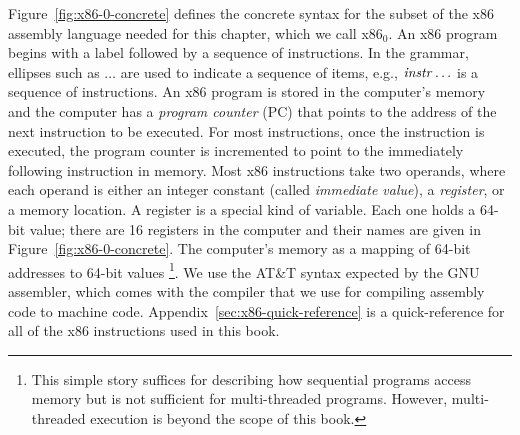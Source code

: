 \documentclass[11pt]{book}
\begin{document}
Figure~\ref{fig:x86-0-concrete} defines the concrete syntax for the subset of
the x86 assembly language needed for this chapter, which we call x86$_0$.
%
An x86 program begins with a  label followed by a sequence
of instructions.  In the grammar, ellipses such as $\ldots$ are used to
indicate a sequence of items, e.g., $\mathit{instr} \ldots$ is a sequence of
instructions.
%
An x86 program is stored in the computer's memory and the computer has
a \emph{program counter} (PC)
that points to the address of the next
instruction to be executed. For most instructions, once the
instruction is executed, the program counter is incremented to point
to the immediately following instruction in memory. Most x86
instructions take two operands, where each operand is either an
integer constant (called \emph{immediate value}),
a \emph{register}, or a memory location.
A register is a special kind of variable. Each
one holds a 64-bit value; there are 16 registers in the computer and
their names are given in Figure~\ref{fig:x86-0-concrete}. The computer's memory
as a mapping of 64-bit addresses to 64-bit values%
\footnote{This simple story suffices for describing how sequential
  programs access memory but is not sufficient for multi-threaded
  programs. However, multi-threaded execution is beyond the scope of
  this book.}.
%
We use the AT\&T syntax expected by the GNU assembler, which comes
with the  compiler that we use for compiling assembly code to
machine code.
%
Appendix~\ref{sec:x86-quick-reference} is a quick-reference for all of
the x86 instructions used in this book.



\newcommand{\allregisters}{\key{rsp} \mid \key{rbp} \mid \key{rax} \mid \key{rbx} \mid \key{rcx}
              \mid \key{rdx} \mid \key{rsi} \mid \key{rdi} \mid \\
              && \key{r8} \mid \key{r9} \mid \key{r10}
              \mid \key{r11} \mid \key{r12} \mid \key{r13}
              \mid \key{r14} \mid \key{r15}}
\end{document}
